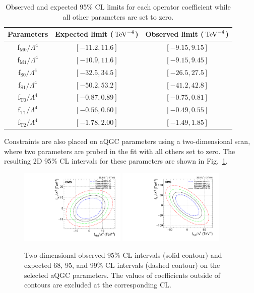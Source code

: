 \begin{table} [htbp]
\centering
\caption{Observed and expected 95\% CL limits for each operator coefficient while all other parameters are set to zero.}
\begin{tabular}{ccc}
\hline 
  Parameters & Expected limit ($\,\text{Te\hspace{-.08em}V}^{-4}$) & Observed limit ($\,\text{Te\hspace{-.08em}V}^{-4}$) \\ 
\hline
f$_{\text{M0}}/\Lambda^4$ & $[-11.2, 11.6]$ & $[-9.15, 9.15]$ \\  
f$_{\text{M1}}/\Lambda^4$ & $[-10.9, 11.6]$ & $[-9.15, 9.45]$ \\  
f$_{\text{S0}}/\Lambda^4$ & $[-32.5, 34.5]$ & $[-26.5, 27.5]$ \\  
f$_{\text{S1}}/\Lambda^4$ & $[-50.2, 53.2]$ & $[-41.2, 42.8]$ \\
f$_{\text{T0}}/\Lambda^4$ & $[-0.87, 0.89]$ & $[-0.75, 0.81]$ \\ 
f$_{\text{T1}}/\Lambda^4$ & $[-0.56, 0.60]$ & $[-0.49, 0.55]$ \\  
f$_{\text{T2}}/\Lambda^4$ & $[-1.78, 2.00]$ & $[-1.49, 1.85]$ \\ 
\hline 
\end{tabular} 
\label{tab:1Dlimits}
\end{table}

Constraints are also placed on aQGC parameters using a two-dimensional scan,
where two parameters are probed in the fit with all others set to zero.
The resulting 2D 95\% CL intervals for these parameters are shown in Fig.~\ref{fig:2Dlimits}.\\

\begin{figure}[htbp]
  \centering
   \includegraphics[width=0.45\textwidth]{figures/AnalysisResults/fm0_fm1_2dlimit_deltaNLL_WZ_aQGC.pdf}
   \includegraphics[width=0.45\textwidth]{figures/AnalysisResults/fs0_fs1_2dlimit_deltaNLL_WZ_aQGC.pdf}
\caption{Two-dimensional observed 95\% CL intervals (solid contour) and expected
68, 95, and 99\% CL intervals (dashed contour) on the selected aQGC parameters.
The values of coefficients 
outside of contours are excluded at the corresponding CL.
 }
 \label{fig:2Dlimits}
\end{figure}


